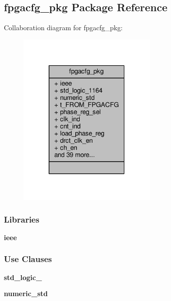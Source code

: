 \subsection{fpgacfg\+\_\+pkg Package Reference}
\label{classfpgacfg__pkg}


Collaboration diagram for fpgacfg\+\_\+pkg\+:\nopagebreak
\begin{figure}[H]
\begin{center}
\leavevmode
\includegraphics[width=196pt]{d3/d86/classfpgacfg__pkg__coll__graph}
\end{center}
\end{figure}
\subsubsection*{Libraries}
 \begin{DoxyCompactItemize}
\item 
{\bf ieee} 
\end{DoxyCompactItemize}
\subsubsection*{Use Clauses}
 \begin{DoxyCompactItemize}
\item 
{\bf std\+\_\+logic\+\_}   
\item 
{\bf numeric\+\_\+std}   
\end{DoxyCompactItemize}
